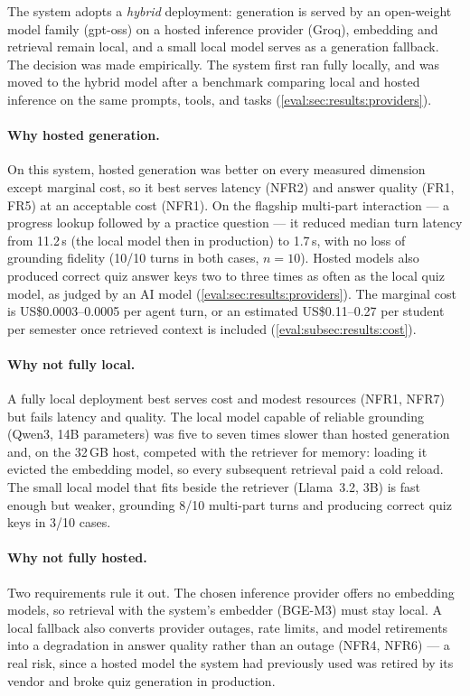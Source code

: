 The system adopts a \emph{hybrid} deployment: generation is served by an
open-weight model family (gpt-oss) on a hosted inference provider (Groq),
embedding and retrieval remain local, and a small local model serves as a
generation fallback. The decision was made empirically. The system first ran
fully locally, and was moved to the hybrid model after a benchmark comparing
local and hosted inference on the same prompts, tools, and tasks
(\autoref{eval:sec:results:providers}).

\paragraph{Why hosted generation.} On this system, hosted generation was
better on every measured dimension except marginal cost, so it best serves
latency (NFR2) and answer quality (FR1, FR5) at an acceptable cost (NFR1). On the flagship
multi-part interaction --- a progress lookup followed by a practice question
--- it reduced median turn latency from 11.2\,s (the local model then in
production) to 1.7\,s, with no loss of grounding fidelity (10/10 turns in
both cases, $n=10$). Hosted models also produced correct quiz answer keys
two to three times as often as the local quiz model, as judged by an AI
model (\autoref{eval:sec:results:providers}). The marginal cost is
US\$0.0003--0.0005 per agent turn, or an estimated US\$0.11--0.27 per
student per semester once retrieved context is included
(\autoref{eval:subsec:results:cost}).

\paragraph{Why not fully local.} A fully local deployment best serves cost
and modest resources (NFR1, NFR7) but fails latency and quality. The local
model capable of reliable grounding (Qwen3, 14B parameters) was five to seven times slower than hosted
generation and, on the 32\,GB host, competed with the retriever for memory:
loading it evicted the embedding model, so every subsequent retrieval paid a
cold reload. The small local model that fits beside the retriever
(Llama~3.2, 3B) is fast enough but weaker, grounding 8/10 multi-part turns
and producing correct quiz keys in 3/10 cases.

\paragraph{Why not fully hosted.} Two requirements rule it out. The chosen
inference provider offers no embedding models, so retrieval with the system's embedder (BGE-M3) must stay
local. A local fallback also converts provider outages, rate limits, and
model retirements into a degradation in answer quality rather than an
outage (NFR4, NFR6) --- a real risk, since a hosted model the system had previously used
was retired by its vendor and broke quiz generation in production.

